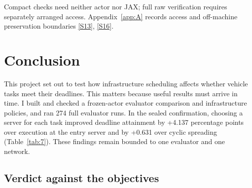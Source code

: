 \documentclass[12pt,a4paper]{article}
\begin{document}
Compact checks need neither actor nor JAX; full raw verification requires separately arranged access. Appendix~\ref{app:A} records access and off-machine preservation boundaries \hyperref[source-s13]{[S13]}, \hyperref[source-s16]{[S16]}.

\section{Conclusion}\label{sec:4}

This project set out to test how infrastructure scheduling affects whether vehicle tasks meet their deadlines. This matters because useful results must arrive in time. I built and checked a frozen-actor evaluator comparison and infrastructure policies, and ran 274 full evaluator runs. In the sealed confirmation, choosing a server for each task improved deadline attainment by +4.137 percentage points over execution at the entry server and by +0.631 over cyclic spreading (Table~\ref{tab:7}). These findings remain bounded to one evaluator and one network.



\FloatBarrier
\subsection{Verdict against the objectives}\label{sec:4.1}
\end{document}
